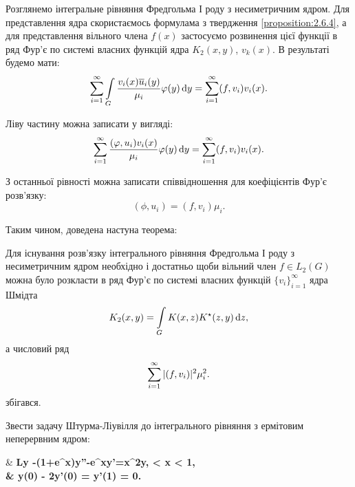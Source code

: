 Розглянемо інтегральне рівняння Фредгольма І роду з несиметричним ядром. Для представлення ядра скористаємось формулама з твердження \ref{proposition:2.6.4}, а для представлення вільного члена $f(x)$ застосуємо розвинення цієї функції в ряд Фур'є по системі власних функцій ядра $K_2(x,y)$, $v_k(x)$. В результаті будемо мати:
\begin{equation}
	\displaystyle\sum\limits_{i=1}^\infty \displaystyle\int\limits_G \dfrac{v_i(x)\overline u_i(y)}{\mu_i} \varphi(y) \mathop{}\!\mathrm{d} y = \displaystyle\sum\limits_{i=1}^\infty (f,v_i)v_i(x).
\end{equation}

Ліву частину можна записати у вигляді:
\begin{equation}
	\displaystyle\sum\limits_{i=1}^\infty \dfrac{(\varphi,u_i)v_i(x)}{\mu_i} \varphi(y) \mathop{}\!\mathrm{d} y = \displaystyle\sum\limits_{i=1}^\infty (f,v_i)v_i(x).
\end{equation}

З останньої рівності можна записати співвідношення для коефіцієнтів Фур'є розв'язку: 
\begin{equation}
	(\phi,u_i)=(f,v_i)\mu_i.
\end{equation}

Таким чином, доведена настуна теорема:
\begin{theorem}
	Для існування розв'язку інтегрального рівняння Фредгольма І роду з несиметричним ядром необхідно і достатньо щоби вільний член $f\in L_2(G)$ можна було розкласти в ряд Фур'є по системі власних функцій $\{v_i\}_{i=1}^\infty$ ядра Шмідта
	\begin{equation}
		K_2(x,y)=\displaystyle\int\limits_G K(x,z)K^\star (z,y)\mathop{}\!\mathrm{d} z,
	\end{equation}
	а числовий ряд
	\begin{equation}
		\displaystyle\sum\limits_{i=1}^\infty |(f,v_i)|^2 \mu_i^2.
	\end{equation}
	збігався.
\end{theorem}

\newpage

\begin{example}
	Звести задачу Штурма-Ліувілля до інтегрального рівняння з ермітовим неперервним ядром:
	\begin{system*}
		& \bf{L}y \equiv -(1+e^x)y''-e^xy'=\lambda x^2y,  < x < 1, \\
		& y(0) - 2y'(0) = y'(1) = 0.
	\end{system*}
\end{example}

